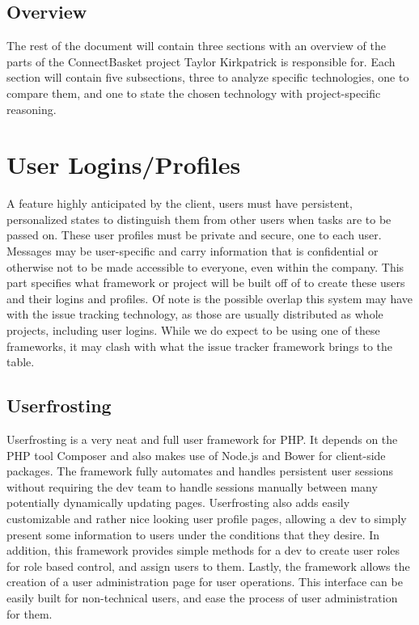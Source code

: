 \documentclass[onecolumn, draftclsnofoot,10pt, compsoc]{IEEEtran}
\begin{document}
\subsection{Overview}
The rest of the document will contain three sections with an overview of the parts of the ConnectBasket project Taylor Kirkpatrick 
is responsible for. Each section will contain five subsections, three to analyze specific technologies, one to compare them, and one 
to state the chosen technology with project-specific reasoning.
\section{User Logins/Profiles}
A feature highly anticipated by the client, users must have persistent, personalized states to distinguish them from other users when tasks are to be 
passed on. These user profiles must be private and secure, one to each user. Messages may be user-specific and carry information that is confidential 
or otherwise not to be made accessible to everyone, even within the company. This part specifies what framework or project will be built off of to 
create these users and their logins and profiles. Of note is the possible overlap this system may have with the issue tracking technology, as those are 
usually distributed as whole projects, including user logins. While we do expect to be using one of these frameworks, it may clash with what the issue tracker 
framework brings to the table.
\subsection{Userfrosting}
Userfrosting is a very neat and full user framework for PHP. It depends on the PHP tool Composer and also makes use of Node.js and Bower for client-side packages.
The framework fully automates and handles persistent user sessions without requiring the dev team to handle sessions manually between many potentially dynamically updating 
pages. Userfrosting also adds easily customizable and rather nice looking user profile pages, allowing a dev to simply present some information to users under the conditions 
that they desire. In addition, this framework provides simple methods for a dev to create user roles for role based control, and assign users to them. Lastly, the framework 
allows the creation of a user administration page for user operations. This interface can be easily built for non-technical users, and ease the process of user administration 
for them.
\end{document}
